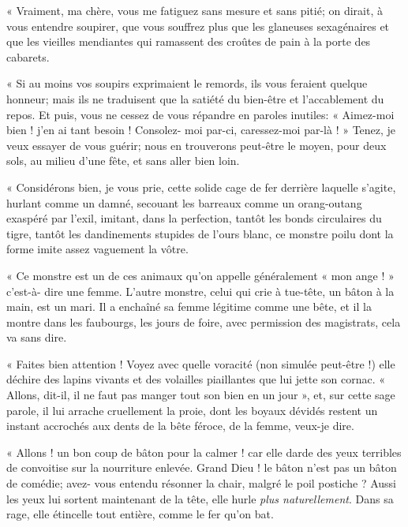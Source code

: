 
« Vraiment, ma chère, vous me fatiguez sans mesure et sans pitié; on
dirait, à vous entendre soupirer, que vous souffrez plus que les
glaneuses sexagénaires et que les vieilles mendiantes qui ramassent des
croûtes de pain à la porte des cabarets.

« Si au moins vos soupirs exprimaient le remords, ils vous feraient
quelque honneur; mais ils ne traduisent que la satiété du bien{}-être
et l’accablement du repos. Et puis, vous ne cessez de
vous répandre en paroles inutiles: « Aimez{}-moi bien !
j’en ai tant besoin ! Consolez{}- moi par{}-ci,
caressez{}-moi par{}-là ! » Tenez, je veux essayer de vous guérir; nous
en trouverons peut{}-être le moyen, pour deux sols, au milieu
d’une fête, et sans aller bien loin.

« Considérons bien, je vous prie, cette solide cage de fer derrière
laquelle s’agite, hurlant comme un damné, secouant les
barreaux comme un orang{}-outang exaspéré par l’exil,
imitant, dans la perfection, tantôt les bonds circulaires du tigre,
tantôt les dandinements stupides de l’ours blanc, ce
monstre poilu dont la forme imite assez vaguement la vôtre.

« Ce monstre est un de ces animaux qu’on appelle
généralement « mon ange ! » c’est{}-à{}- dire une
femme. L’autre monstre, celui qui crie à tue{}-tête,
un bâton à la main, est un mari. Il a enchaîné sa femme légitime comme
une bête, et il la montre dans les faubourgs, les jours de foire, avec
permission des magistrats, cela va sans dire.

« Faites bien attention ! Voyez avec quelle voracité (non simulée
peut{}-être !) elle déchire des lapins vivants et des volailles
piaillantes que lui jette son cornac. « Allons, dit{}-il, il ne faut
pas manger tout son bien en un jour », et, sur cette sage parole, il
lui arrache cruellement la proie, dont les boyaux dévidés restent un
instant accrochés aux dents de la bête féroce, de la femme, veux{}-je
dire.

« Allons ! un bon coup de bâton pour la calmer ! car elle darde des yeux
terribles de convoitise sur la nourriture enlevée. Grand Dieu ! le
bâton n’est pas un bâton de comédie; avez{}- vous
entendu résonner la chair, malgré le poil postiche ? Aussi les yeux lui
sortent maintenant de la tête, elle hurle \textit{plus naturellement}. Dans sa
rage, elle étincelle tout entière, comme le fer qu’on
bat.

